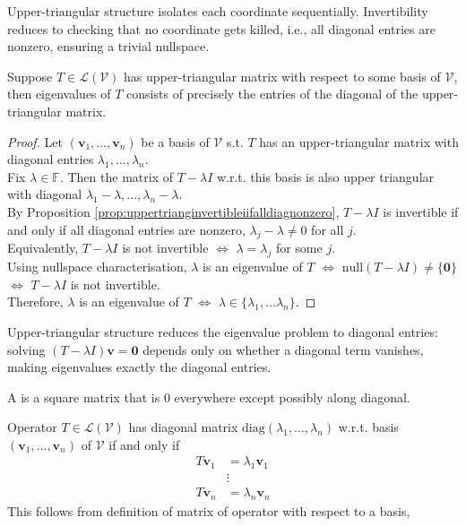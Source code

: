 Upper-triangular structure isolates each coordinate sequentially. Invertibility reduces to checking that no coordinate gets killed, i.e., all diagonal entries are nonzero, ensuring a trivial nullspace.

\begin{proposition} Suppose $T \in \mathcal{L}(\mathcal{V})$ has upper-triangular matrix with respect to some basis of $\mathcal{V}$, then eigenvalues of $T$ consists of precisely the entries of the diagonal of the upper-triangular matrix.
\begin{proof} Let $(\mathbf{v}_1, \ldots, \mathbf{v}_n)$ be a basis of $\mathcal{V}$ s.t. $T$ has an upper-triangular matrix with diagonal entries $\lambda_1, \ldots, \lambda_n$.\\
Fix $\lambda \in \mathbb{F}$. Then the matrix of $T - \lambda I$ w.r.t. this basis is also upper triangular with diagonal $\lambda_1 - \lambda, \ldots, \lambda_n - \lambda$.\\
By Proposition \ref{prop:uppertrianginvertibleiifalldiagnonzero}, $T - \lambda I$ is invertible if and only if all diagonal entries are nonzero, $\lambda_j - \lambda \neq 0$ for all $j$.\\
Equivalently, $T - \lambda I$ is not invertible $\Leftrightarrow$ $\lambda = \lambda_j$ for some $j$.\\
Using nullspace characterisation, $\lambda$ is an eigenvalue of $T$ $\Leftrightarrow$ $\text{null}(T - \lambda I) \neq \{ \mathbf{0} \}$ $\Leftrightarrow$ $T - \lambda I$ is not invertible.\\
Therefore, $\lambda$ is an eigenvalue of $T$ $\Leftrightarrow$ $\lambda \in \{\lambda_1, \ldots \lambda_n \}$.
\end{proof}
\end{proposition}

Upper-triangular structure reduces the eigenvalue problem to diagonal entries: solving $(T - \lambda I)\mathbf{v} = \mathbf{0}$ depends only on whether a diagonal term vanishes, making eigenvalues exactly the diagonal entries.

\begin{definition} A  is a square matrix that is $0$ everywhere except possibly along diagonal.
\end{definition}

Operator $T \in \mathcal{L}(\mathcal{V})$ has diagonal matrix $\text{diag}(\lambda_1, \ldots, \lambda_n)$ w.r.t. basis $(\mathbf{v}_1, \ldots, \mathbf{v}_n)$ of $\mathcal{V}$ if and only if
\begin{align}
T \mathbf{v}_1 &= \lambda_1 \mathbf{v}_1 \nonumber \\
&\vdots \nonumber \\
T \mathbf{v}_n &= \lambda_n \mathbf{v}_n \nonumber
\end{align}
This follows from definition of matrix of operator with respect to a basis,\\

